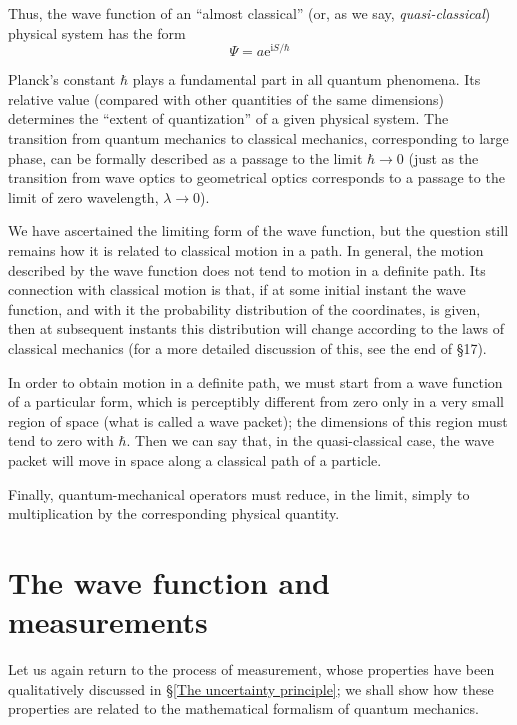 Thus, the wave function of an “almost classical” (or, as we say, \textit{quasi-classical}) physical system has the form
\begin{equation}\label{6.1}
\Psi=a\mathrm{e}^{\mathrm{i}S/\hbar}
\end{equation}	

Planck’s constant $\hbar$ plays a fundamental part in all quantum phenomena. Its relative value (compared with other quantities of the same dimensions) determines the “extent of quantization” of a given physical system. The transition from quantum mechanics to classical mechanics, corresponding to large phase, can be formally described as a passage to the limit $ \hbar \rightarrow 0 $ (just as the transition from wave optics to geometrical optics corresponds to a passage to the limit of zero wavelength, $ \lambda \rightarrow 0 $).
	
We have ascertained the limiting form of the wave function, but the question still remains how it is related to classical motion in a path. In general, the motion described by the wave function does not tend to motion in a definite path. Its connection with classical motion is that, if at some initial instant the wave function, and with it the probability distribution of the coordinates, is given, then at subsequent instants this distribution will change according to the laws of classical mechanics (for a more detailed discussion of this, see the end of §17).
	
In order to obtain motion in a definite path, we must start from a wave function of a particular form, which is perceptibly different from zero only in a very small region of space (what is called a wave packet); the dimensions of this region must tend to zero with $\hbar$. Then we can say that, in the quasi-classical case, the wave packet will move in space along a classical path of a particle.
	
Finally, quantum-mechanical operators must reduce, in the limit, simply to multiplication by the corresponding physical quantity.
\section{The wave function and measurements}\label{The wave function and measurements}	
Let us again return to the process of measurement, whose properties have been qualitatively discussed in §\ref{The uncertainty principle}; we shall show how these properties are related to the mathematical formalism of quantum mechanics.
	
